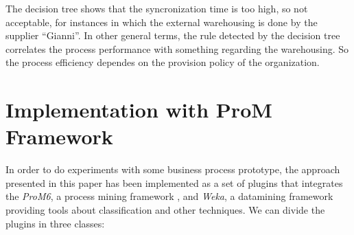 \documentclass{llncs}
\begin{document}
The decision tree shows that the syncronization time is too high, so not acceptable, for instances in which the external warehousing is done by the supplier ``Gianni''. In other general terms, the rule detected by the decision tree correlates the process performance with something regarding the warehousing. So the process efficiency dependes on the provision policy of the organization. 

\section{Implementation with ProM Framework}
In order to do experiments with some business process prototype, the approach presented in this paper has been implemented as a set of plugins that integrates the \emph{ProM6}, a process mining framework \cite{}, and \emph{Weka}, a datamining framework providing tools about classification and other techniques. 
We can divide the plugins in three classes:
\end{document}
